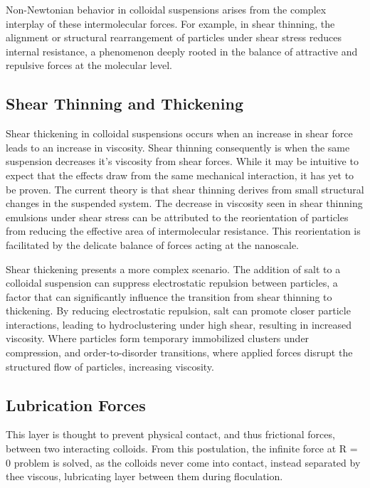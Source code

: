 Non-Newtonian behavior in colloidal suspensions arises from the complex interplay of these intermolecular forces. For example, in shear thinning, the alignment or structural rearrangement of particles under shear stress reduces internal resistance, a phenomenon deeply rooted in the balance of attractive and repulsive forces at the molecular level.\cite{Rheo2}

\subsection{Shear Thinning and Thickening}
Shear thickening in colloidal suspensions occurs when an increase in shear force leads to an increase in viscosity. Shear thinning consequently is when the same suspension decreases it's viscosity from shear forces. While it may be intuitive to expect that the effects draw from the same mechanical interaction, it has yet to be proven. The current theory is that shear thinning derives from small structural changes in the suspended system. The decrease in viscosity seen in shear thinning emulsions under shear stress can be attributed to the reorientation of particles from reducing the effective area of intermolecular resistance. This reorientation is facilitated by the delicate balance of forces acting at the nanoscale. 

Shear thickening presents a more complex scenario. The addition of salt to a colloidal suspension can suppress electrostatic repulsion between particles, a factor that can significantly influence the transition from shear thinning to thickening. By reducing electrostatic repulsion, salt can promote closer particle interactions, leading to hydroclustering under high shear, resulting in increased viscosity. Where particles form temporary immobilized clusters under compression, and order-to-disorder transitions, where applied forces disrupt the structured flow of particles, increasing viscosity. \cite{hydroshock, ShockCrash}

\subsection{Lubrication Forces}
 This layer is thought to prevent physical contact, and thus frictional forces, between two interacting colloids. From this postulation, the infinite force at R = 0 problem is solved, as the colloids never come into contact, instead separated by thee viscous, lubricating layer between them during floculation. 

